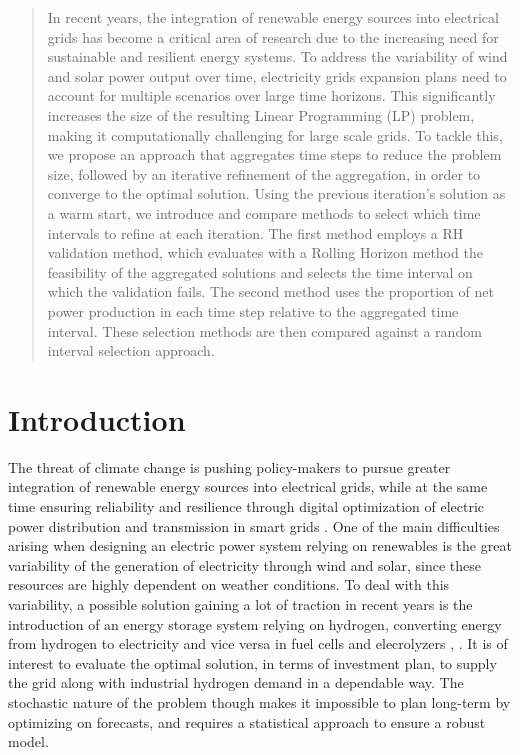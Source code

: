 \documentclass[smallextended,natbib]{svjour3}       %
\numberwithin{definition}{section}
\numberwithin{theorem}{section}
\numberwithin{proposition}{section}
\begin{document}
\begin{abstract}
  In recent years, the integration of renewable energy sources into electrical grids has become a critical area of research due to the increasing need for sustainable and resilient energy systems. 
  To address the variability of wind and solar power output over time, electricity grids expansion plans need to account for multiple scenarios over large time horizons.
  This significantly increases the size of the resulting Linear Programming (LP) problem, making it computationally challenging for large scale grids. 
  To tackle this, we propose an approach that aggregates time steps to reduce the problem size, followed by an iterative refinement of the aggregation, in order to converge to the optimal solution.
  Using the previous iteration's solution as a warm start, we introduce and compare methods to select which time intervals to refine at each iteration.
  The first method employs a RH validation method, which evaluates with a Rolling Horizon method the feasibility of the aggregated solutions and selects the time interval on which the validation fails. 
  The second method uses the proportion of net power production in each time step relative to the aggregated time interval. 
  These selection methods are then compared against a random interval selection approach. 


\end{abstract}



\newpage
\section{Introduction}


The threat of climate change is pushing policy-makers to pursue greater integration of renewable energy sources into
 electrical grids, while at the same time ensuring reliability and resilience through digital optimization of electric 
 power distribution and transmission in smart grids \citep{EU_context}. 
One of the main difficulties arising when designing an electric power system relying on renewables is the great variability
 of the generation of electricity through wind and solar, since these resources are highly dependent on weather conditions. 
To deal with this variability, a possible solution gaining a lot of traction in recent years is the introduction of an energy
 storage system relying on hydrogen, converting energy from hydrogen to electricity and vice versa in fuel cells and 
 elecrolyzers \citep{INTRO_blanco}, \citep{INTRO_parra}. 
It is of interest to evaluate the optimal solution, in terms of investment plan, to supply the grid along with industrial
 hydrogen demand in a dependable way. 
The stochastic nature of the problem though makes it impossible to plan long-term by optimizing on forecasts, and requires
 a statistical approach to ensure a robust model.
\end{document}
